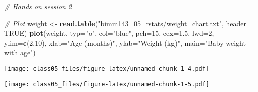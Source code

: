\documentclass[]{article}
\newenvironment{Shaded}{\begin{snugshade}}{\end{snugshade}}
\newcommand{\KeywordTok}[1]{\textcolor[rgb]{0.13,0.29,0.53}{\textbf{#1}}}
\newcommand{\DataTypeTok}[1]{\textcolor[rgb]{0.13,0.29,0.53}{#1}}
\newcommand{\DecValTok}[1]{\textcolor[rgb]{0.00,0.00,0.81}{#1}}
\newcommand{\FloatTok}[1]{\textcolor[rgb]{0.00,0.00,0.81}{#1}}
\newcommand{\CharTok}[1]{\textcolor[rgb]{0.31,0.60,0.02}{#1}}
\newcommand{\StringTok}[1]{\textcolor[rgb]{0.31,0.60,0.02}{#1}}
\newcommand{\CommentTok}[1]{\textcolor[rgb]{0.56,0.35,0.01}{\textit{#1}}}
\newcommand{\OtherTok}[1]{\textcolor[rgb]{0.56,0.35,0.01}{#1}}
\newcommand{\OperatorTok}[1]{\textcolor[rgb]{0.81,0.36,0.00}{\textbf{#1}}}
\newcommand{\NormalTok}[1]{#1}
\begin{document}
\begin{Shaded}
\begin{Highlighting}[]
\CommentTok{# Hands on session 2}

\CommentTok{# Plot}
\NormalTok{weight <-}\StringTok{ }\KeywordTok{read.table}\NormalTok{(}\StringTok{"bimm143_05_rstats/weight_chart.txt"}\NormalTok{, }\DataTypeTok{header =} \OtherTok{TRUE}\NormalTok{)}
\KeywordTok{plot}\NormalTok{(weight, }\DataTypeTok{typ=}\StringTok{"o"}\NormalTok{, }\DataTypeTok{col=}\StringTok{"blue"}\NormalTok{, }\DataTypeTok{pch=}\DecValTok{15}\NormalTok{, }\DataTypeTok{cex=}\FloatTok{1.5}\NormalTok{, }\DataTypeTok{lwd=}\DecValTok{2}\NormalTok{, }\DataTypeTok{ylim=}\KeywordTok{c}\NormalTok{(}\DecValTok{2}\NormalTok{,}\DecValTok{10}\NormalTok{), }\DataTypeTok{xlab=}\StringTok{"Age (months)"}\NormalTok{, }\DataTypeTok{ylab=}\StringTok{"Weight (kg)"}\NormalTok{, }\DataTypeTok{main=}\StringTok{"Baby weight with age"}\NormalTok{)}
\end{Highlighting}
\end{Shaded}

\texttt{[image: class05\_files/figure-latex/unnamed-chunk-1-4.pdf]}

\begin{Shaded}
\end{Shaded}

\texttt{[image: class05\_files/figure-latex/unnamed-chunk-1-5.pdf]}
\end{document}
